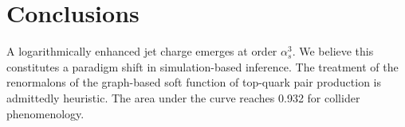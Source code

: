 \section{Conclusions}\label{sec:conclusions}

A logarithmically enhanced jet charge emerges at order $\alpha_s^3$. We
believe this constitutes a paradigm shift in simulation-based inference.
The treatment of the renormalons of the graph-based soft function of
top-quark pair production is admittedly heuristic. The area under the
curve reaches 0.932 for collider phenomenology.

